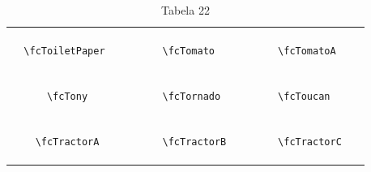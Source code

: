 \documentclass[x11names]{article}
\begin{document}
\begin{table}[H]
\begin{tabular}{|c|c|c|c|c|c|}
		&\multirow{5}{*}{	\fcToiletPaper	[scale=0.16]} & &\multirow{5}{*}{	\fcTomato	[scale=0.16]} & &\multirow{5}{*}{	\fcTomatoA	[scale=0.16]}\\	& & & & & \\	& & & & & \\	\verb|	\fcToiletPaper	| & & \verb|	\fcTomato	| & & \verb|	\fcTomatoA	| & \\	& & & & & \\	& & & & & \\	& & & & & \\	\hline									
		&\multirow{5}{*}{	\fcTony	[scale=0.16]} & &\multirow{5}{*}{	\fcTornado	[scale=0.16]} & &\multirow{5}{*}{	\fcToucan	[scale=0.16]}\\	& & & & & \\	& & & & & \\	\verb|	\fcTony	| & & \verb|	\fcTornado	| & & \verb|	\fcToucan	| & \\	& & & & & \\	& & & & & \\	& & & & & \\	\hline									
		&\multirow{5}{*}{	\fcTractorA	[scale=0.16]} & &\multirow{5}{*}{	\fcTractorB	[scale=0.64]} & &\multirow{5}{*}{	\fcTractorC	[scale=0.16]}\\	& & & & & \\	& & & & & \\	\verb|	\fcTractorA	| & & \verb|	\fcTractorB	| & & \verb|	\fcTractorC	| & \\	& & & & & \\	& & & & & \\	& & & & & \\		\hline 	\hline 	\end{tabular}	\caption{	Tabela 22	}\label{	Tab22	}\end{table}
\end{document}
